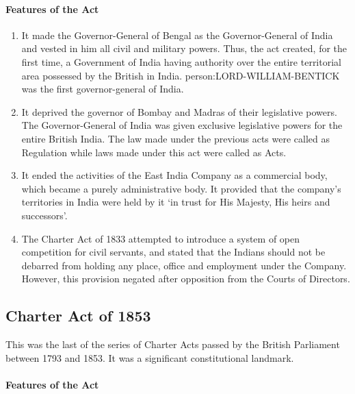 \begin{multicol}{2}
\paragraph{Features of the Act}
\begin{enumerate}
  \item It made the Governor-General of Bengal as the Governor-General of India and vested in him all civil and military powers. Thus, the act created, for the first time, a Government of India having authority over the entire territorial area possessed by the British in India. \gls{person:LORD-WILLIAM-BENTICK} was the first governor-general of India.
  \item It deprived the governor of Bombay and Madras of their legislative powers. The Governor-General of India was given exclusive legislative powers for the entire British India. The law made under the previous acts were called as Regulation while laws made under this act were called as Acts.
  \item It ended the activities of the East India Company as a commercial body, which became a purely administrative body. It provided that the company's territories in India were held by it `in trust for His Majesty, His heirs and successors'.
  \item The Charter Act of 1833 attempted to introduce a system of open competition for civil servants, and stated that the Indians should not be debarred from holding any place, office and employment under the Company. However, this provision negated after opposition from the Courts of Directors.
\end{enumerate}

\subsection{Charter Act of 1853}

This was the last of the series of Charter Acts passed by the British Parliament between 1793 and 1853. It was a significant constitutional landmark.
\paragraph{Features of the Act}


\end{multicol}
